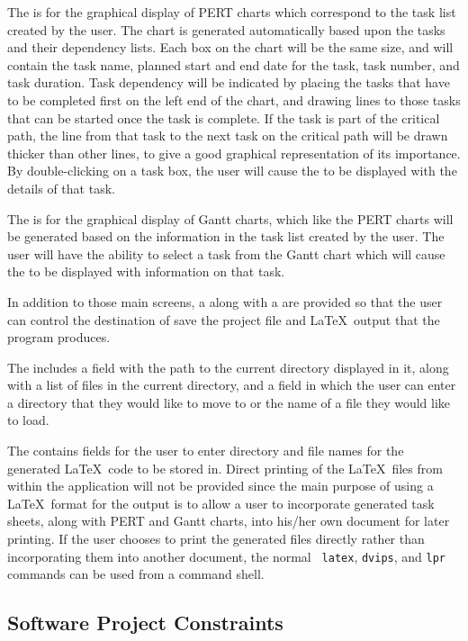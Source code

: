 The \pcscreen\/ is for the graphical display of PERT charts which
correspond to the task list created by the user.  The chart is
generated automatically based upon the tasks and their dependency
lists.  Each box on the chart will be the same size, and will contain
the task name, planned start and end date for the task, task number,
and task duration.  Task dependency will be indicated by placing the
tasks that have to be completed first on the left end of the chart,
and drawing lines to those tasks that can be started once the task is
complete.  If the task is part of the critical path, the line from
that task to the next task on the critical path will be drawn thicker
than other lines, to give a good graphical representation of its
importance.  By double-clicking on a task box, the user will cause the
\tiscreen\/ to be displayed with the details of that task.

The \gcscreen\/ is for the graphical display of Gantt charts, which
like the PERT charts will be generated based on the information in the
task list created by the user.  The user will have the ability to
select a task from the Gantt chart which will cause the \tiscreen\/ to
be displayed with information on that task.

In addition to those main screens, a \flsscreen\/ along with a
\poscreen\/ are provided so that the user can control the destination
of save the project file and \LaTeX\ output that the program produces.

The \flsscreen\/ includes a field with the path to the current
directory displayed in it, along with a list of files in the current
directory, and a field in which the user can enter a directory that
they would like to move to or the name of a file they would like to
load.

The \poscreen\/ contains fields for the user to enter directory and
file names for the generated \LaTeX\ code to be stored in.  Direct
printing of the \LaTeX\ files from within the application will not be
provided since the main purpose of using a \LaTeX\ format for the
output is to allow a user to incorporate generated task sheets, along
with PERT and Gantt charts, into his/her own document for later
printing.  If the user chooses to print the generated files directly
rather than incorporating them into another document, the normal {\tt
latex}, {\tt dvips}, and {\tt lpr} commands can be used from a command
shell.

%
%
\subsection{Software Project Constraints}

